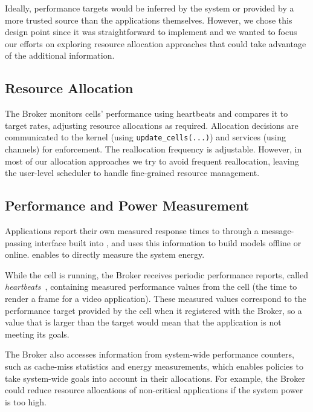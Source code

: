 Ideally, performance targets would be inferred by the system or provided by a
more trusted source than the applications themselves.  
However, we chose this design point since it was straightforward to implement
and we wanted to focus our efforts on exploring resource allocation approaches
that could take advantage of the additional information.

\subsection{Resource Allocation}

The Broker monitors cells' performance using heartbeats and compares it to
target rates, adjusting resource allocations as required.  Allocation
decisions are communicated to the kernel (using \texttt{update\_cells(...)})
and services (using channels) for enforcement.  The reallocation
frequency is adjustable.  However, in most of our allocation
approaches we try to avoid frequent reallocation, leaving the
user-level scheduler to handle fine-grained resource management.

\subsection{Performance and Power Measurement}
Applications report their own measured response times to \pacora
through a message-passing interface built into \tess, and \pacora uses
this information to build models offline or online. 
\tess enables \pacora to directly measure the system energy.


 While the cell is running, the Broker receives periodic
performance reports, called \emph{heartbeats}~\cite{hoffmann2011}, containing
measured performance values from the cell (\eg the time to render a
frame for a video application).  These measured values correspond to the
performance target provided by the cell when it registered with the
Broker, so a value that is larger than the target would mean that the
application is not meeting its goals.  

The Broker also accesses information from system-wide performance
counters, such as cache-miss statistics and energy measurements, which
enables policies to take system-wide goals into account in their
allocations.  For example, the Broker could reduce resource allocations
of non-critical applications if the system power is too high.

